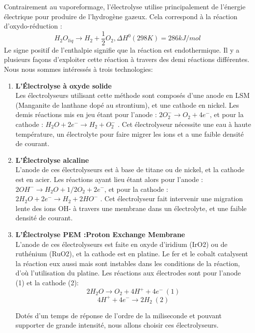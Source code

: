 \documentclass[11pt,french,a4paper]{article}
\begin{document}
Contrairement au vaporeformage, l’électrolyse utilise principalement de l’énergie électrique pour produire de l’hydrogène gazeux. Cela correspond à la réaction d'oxydo-réduction : 
$$H_2O_{liq} \rightarrow H_2 + \frac{1}{2} O_2 , \Delta H^0 (298 K) = 286 kJ/mol $$
Le signe positif de l’enthalpie signifie que la réaction est endothermique.
Il y a plusieurs façons d’exploiter cette réaction à travers des demi réactions différentes. Nous nous sommes intéressés à trois technologies:\\

\begin{enumerate}
\item \textbf{L’Électrolyse à oxyde solide} \\ Les électrolyseurs utilisant cette méthode sont composés d’une anode en LSM (Manganite de lanthane dopé au strontium), et une cathode en nickel. Les demis réactions mis en jeu étant pour l’anode :  $2 O_2^- \rightarrow O_2 + 4 e^- $, et pour la cathode : $H_2O + 2 e^- \rightarrow H_2 + O_2^- $ . Cet électrolyseur nécessite une eau à haute température, un électrolyte pour faire migrer les ions et a une faible densité de courant. \\

\item \textbf{L’Électrolyse alcaline} \\ L’anode de ces électrolyseurs est à base de titane ou de nickel, et la cathode est en acier. Les réactions ayant lieu étant alors pour l’anode :  $2 OH^- \rightarrow H_2O + 1/2 O_2 + 2e^- $, et pour la cathode : $2 H_2O + 2 e^- \rightarrow H_2 +2 HO^- $ . Cet électrolyseur fait intervenir une migration lente des ions OH- à travers une membrane dans un électrolyte, et une faible densité de courant.\\

\item \textbf{L’Électrolyse PEM :Proton Exchange Membrane }\\ 
L’anode de ces électrolyseurs est faite en oxyde d'iridium (IrO2) ou de ruthénium (RuO2), et la cathode est en platine. Le fer et le cobalt catalysent la réaction eux aussi mais sont instables dans les conditions de la réaction, d’où l’utilisation du platine. Les réactions aux électrodes sont pour l’anode (1) et la cathode (2):  
$$2H_2O \rightarrow O_2 + 4H^+ + 4e^- \  (1) $$ $$ 4H^+ + 4e^-  \rightarrow 2H_2  \ (2)$$

Dotés d’un temps de réponse de l’ordre de la miliseconde et pouvant supporter de grande intensité, nous allons choisir ces électrolyseurs.

\end{enumerate}
\end{document}
